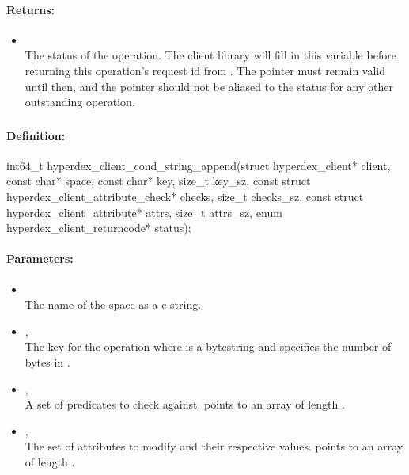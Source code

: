 \paragraph{Returns:}
\begin{itemize}[noitemsep]
\item {}\\
The status of the operation.  The client library will fill in this variable before returning this operation's request id from .  The pointer must remain valid until then, and the pointer should not be aliased to the status for any other outstanding operation.
\end{itemize}

\pagebreak
\subsubsection{}
\label{api:c:cond_string_append}


\paragraph{Definition:}
\begin{ccode}
int64_t hyperdex_client_cond_string_append(struct hyperdex_client* client,
        const char* space,
        const char* key, size_t key_sz,
        const struct hyperdex_client_attribute_check* checks, size_t checks_sz,
        const struct hyperdex_client_attribute* attrs, size_t attrs_sz,
        enum hyperdex_client_returncode* status);
\end{ccode}

\paragraph{Parameters:}
\begin{itemize}[noitemsep]
\item {}\\
The name of the space as a c-string.
\item {}, \\
The key for the operation where  is a bytestring and  specifies the number of bytes in .
\item {}, \\
A set of predicates to check against.   points to an array of length .
\item {}, \\
The set of attributes to modify and their respective values.   points to an array of length .
\end{itemize}

